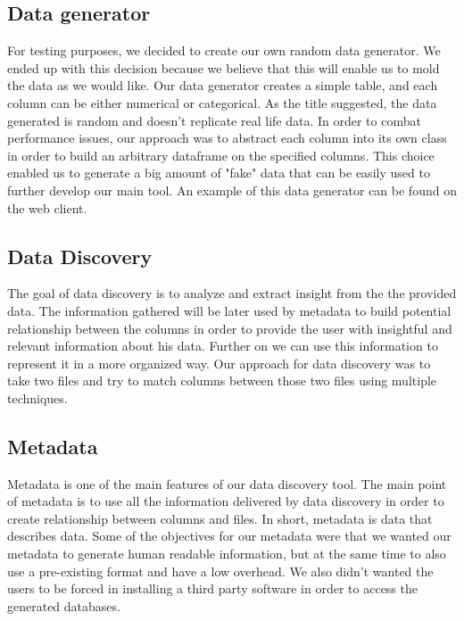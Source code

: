\subsection{Data generator}
For testing purposes, we decided to create our own random data generator. We ended up with this decision because we believe that this will enable us to mold the data as we would like. Our data generator creates a simple table, and each column can be either numerical or categorical. As the title suggested, the data generated is random and doesn't replicate real life data. In order to combat performance issues, our approach was to abstract each column into its own class in order to build an arbitrary dataframe
on the specified columns. This choice enabled us to generate a big amount of "fake" data that can be easily used to further develop our main tool. An example of this data generator can be found on the web client.
\vspace{5mm} %
\subsection{Data Discovery}
The goal of data discovery is to analyze and extract insight from the the provided data. The information gathered will be later used by metadata to build potential relationship between the columns in order to provide the user with insightful and relevant information about his data. Further on we can use this information to represent it in a more organized way. Our approach for data discovery was to take two files and try to match columns between those two files using multiple techniques.

\vspace{5mm} %
\subsection{Metadata}
Metadata is one of the main features of our data discovery tool. The main point of metadata is to use all the information delivered by data discovery in order to create relationship between columns and files. In short, metadata is data that describes data.
\newline
Some of the objectives for our metadata were that we wanted our metadata to generate human readable information, but at the same time to also use a pre-existing format and have a low overhead. We also didn't wanted the users to be forced in installing a third party software in order to access the generated databases.
\newline

\clearpage
